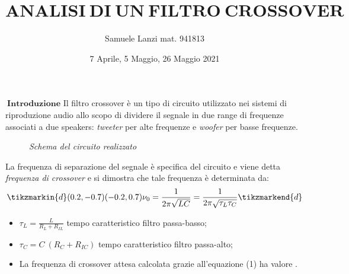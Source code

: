\documentclass{beamer}
\title{$\boxed{\mathbf{ANALISI \ DI \ UN \ FILTRO \ CROSSOVER}}$}
\author{Samuele Lanzi mat. 941813}
\date{7 Aprile, 5 Maggio, 26 Maggio 2021}
\begin{document}
\begin{frame}
    \maketitle
\end{frame}

\begin{frame}{$\mathbf{\ Introduzione}$}
    Il filtro crossover è un tipo di circuito utilizzato nei sistemi di riproduzione audio
allo scopo di dividere il segnale in due range di frequenze associati a due speakers: 
\textit{tweeter} per alte frequenze e \textit{woofer} per basse frequenze.
    \begin{figure}
        \scalebox{.5}{}
        \caption{\textit{Schema del circuito realizzato}}
    \end{figure}
\end{frame}

\begin{frame}
    La frequenza di separazione del 
segnale è specifica del circuito e viene detta \textit{frequenza di crossover} e si dimostra  che tale frequenza è determinata da:
\begin{equation}
    \begin{split}
    \tikzmarkin{d}(0.2,-0.7)(-0.2,0.7)
        \nu_0=\frac{1}{2\pi\sqrt{LC}}=\frac{1}{2\pi\sqrt{\tau_L\tau_C}}
    \tikzmarkend{d}
    \end{split}
\end{equation}
\begin{itemize}
    \item <1-> $\tau_L = \frac{L}{R_L+R_{IL}}$ tempo caratteristico filtro passa-basso;
    \item <2-> $\tau_C= C \ (R_C+R_{IC})$ tempo caratteristico filtro passa-alto;
    \item <3-> La frequenza di crossover attesa calcolata grazie all'equazione (1) ha valore \color{blue}{$\nu_0=(4021 \pm 40) \ Hz$}.
\end{itemize}
\end{frame}
\end{document}

